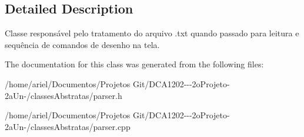 \subsection{Detailed Description}
Classe responsável pelo tratamento do arquivo .txt quando passado para leitura e sequência de comandos de desenho na tela. 

The documentation for this class was generated from the following files\+:\begin{DoxyCompactItemize}
\item 
/home/ariel/\+Documentos/\+Projetos Git/\+D\+C\+A1202-\/-\/-\/2o\+Projeto-\/2a\+Un-\//classes\+Abstratas/parser.\+h\item 
/home/ariel/\+Documentos/\+Projetos Git/\+D\+C\+A1202-\/-\/-\/2o\+Projeto-\/2a\+Un-\//classes\+Abstratas/parser.\+cpp\end{DoxyCompactItemize}
